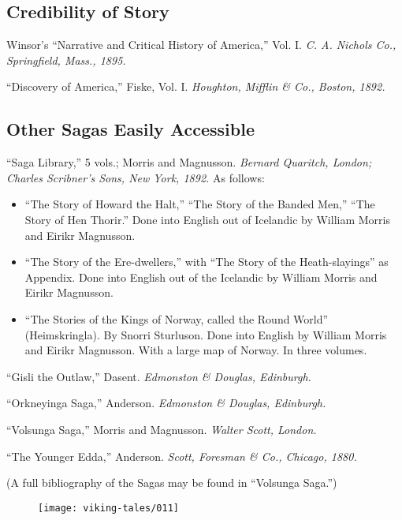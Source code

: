 \subsection*{Credibility of Story}

Winsor's ``Narrative and Critical History of America,'' Vol. I. \emph{C.
A. Nichols Co., Springfield, Mass., 1895.}

\noindent ``Discovery of America,'' Fiske, Vol. I. \emph{Houghton,
Mifflin \& Co., Boston, 1892.}

\subsection*{Other Sagas Easily Accessible}

``Saga Library,'' 5 vols.; Morris and Magnusson. \emph{Bernard Quaritch,
London; Charles Scribner's Sons, New York, 1892.} As follows:

\begin{itemize}
\item ``The Story of Howard the Halt,'' ``The Story of the Banded Men,'' ``The
Story of Hen Thorir.'' Done into English out of Icelandic by William
Morris and Eirikr Magnusson.
\item ``The Story of the Ere-dwellers,'' with ``The Story of the
Heath-slayings'' as Appendix. Done into English out of the Icelandic
by William Morris and Eirikr Magnusson.
\item ``The Stories of the Kings of Norway, called the Round World''
(Heimskringla). By Snorri Sturluson. Done into English by William
Morris and Eirikr Magnusson. With a large map of Norway. In three
volumes.
\end{itemize}

\noindent ``Gisli the Outlaw,'' Dasent. \emph{Edmonston \& Douglas,
Edinburgh.}

\noindent ``Orkneyinga Saga,'' Anderson. \emph{Edmonston \& Douglas,
Edinburgh.}

\noindent ``Volsunga Saga,'' Morris and Magnusson. \emph{Walter Scott,
London.}

\noindent ``The Younger Edda,'' Anderson. \emph{Scott, Foresman \& Co.,
Chicago, 1880.}

\noindent (A full bibliography of the Sagas may be found in ``Volsunga
Saga.'')

\begin{figure}[hb]
    \centering
    \vskip8pt
    \texttt{[image: viking-tales/011]}
\end{figure}

